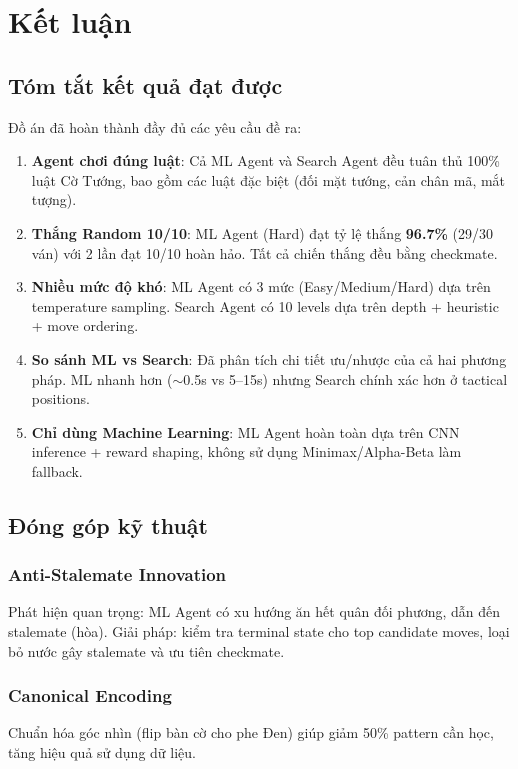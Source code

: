 \section{Kết luận}

\subsection{Tóm tắt kết quả đạt được}
Đồ án đã hoàn thành đầy đủ các yêu cầu đề ra:

\begin{enumerate}[label=\textbf{\arabic*.}]
    \item \textbf{Agent chơi đúng luật}: Cả ML Agent và Search Agent đều tuân thủ 100\% luật Cờ Tướng, bao gồm các luật đặc biệt (đối mặt tướng, cản chân mã, mắt tượng).

    \item \textbf{Thắng Random 10/10}: ML Agent (Hard) đạt tỷ lệ thắng \textbf{96.7\%} (29/30 ván) với 2 lần đạt 10/10 hoàn hảo. Tất cả chiến thắng đều bằng checkmate.

    \item \textbf{Nhiều mức độ khó}: ML Agent có 3 mức (Easy/Medium/Hard) dựa trên temperature sampling. Search Agent có 10 levels dựa trên depth + heuristic + move ordering.

    \item \textbf{So sánh ML vs Search}: Đã phân tích chi tiết ưu/nhược của cả hai phương pháp. ML nhanh hơn ($\sim$0.5s vs 5--15s) nhưng Search chính xác hơn ở tactical positions.

    \item \textbf{Chỉ dùng Machine Learning}: ML Agent hoàn toàn dựa trên CNN inference + reward shaping, không sử dụng Minimax/Alpha-Beta làm fallback.
\end{enumerate}

\subsection{Đóng góp kỹ thuật}

\subsubsection{Anti-Stalemate Innovation}
Phát hiện quan trọng: ML Agent có xu hướng ăn hết quân đối phương, dẫn đến stalemate (hòa). Giải pháp: kiểm tra terminal state cho top candidate moves, loại bỏ nước gây stalemate và ưu tiên checkmate.

\subsubsection{Canonical Encoding}
Chuẩn hóa góc nhìn (flip bàn cờ cho phe Đen) giúp giảm 50\% pattern cần học, tăng hiệu quả sử dụng dữ liệu.

